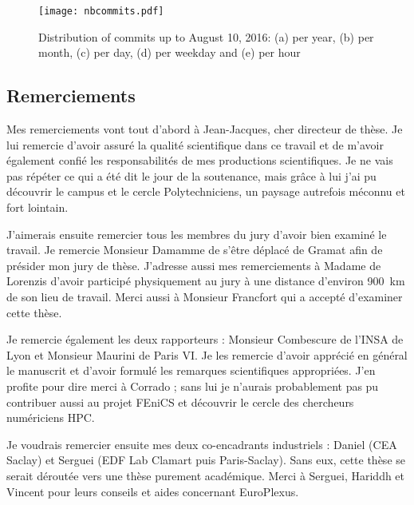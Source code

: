 \begin{figure}[htbp]
\centering
\texttt{[image: nbcommits.pdf]}
\caption{Distribution of commits up to August 10, 2016: (a) per year, (b) per month, (c) per day, (d) per weekday and (e) per hour} \label{fig:nbcommits}
\end{figure}

\subsection*{Remerciements}
Mes remerciements vont tout d'abord à Jean-Jacques, cher directeur de thèse. Je lui remercie d'avoir assuré la qualité scientifique dans ce travail et de m'avoir également confié les responsabilités de mes productions scientifiques. Je ne vais pas répéter ce qui a été dit le jour de la soutenance, mais grâce à lui j'ai pu découvrir le campus et le cercle Polytechniciens, un paysage autrefois méconnu et fort lointain.

\vspace{0.2cm}

J'aimerais ensuite remercier tous les membres du jury d'avoir bien examiné le travail. Je remercie Monsieur Damamme de s'être déplacé de Gramat afin de présider mon jury de thèse. J'adresse aussi mes remerciements à Madame de Lorenzis d'avoir participé physiquement au jury à une distance d'environ \SI{900}{km} de son lieu de travail. Merci aussi à Monsieur Francfort qui a accepté d'examiner cette thèse.

\vspace{0.2cm}

Je remercie également les deux rapporteurs : Monsieur Combescure de l'INSA de Lyon et Monsieur Maurini de Paris VI. Je les remercie d'avoir apprécié en général le manuscrit et d'avoir formulé les remarques scientifiques appropriées. J'en profite pour dire merci à Corrado ; sans lui je n'aurais probablement pas pu contribuer aussi au projet FEniCS et découvrir le cercle des chercheurs numériciens HPC.

\vspace{0.2cm}

Je voudrais remercier ensuite mes deux co-encadrants industriels : Daniel (CEA Saclay) et Serguei (EDF Lab Clamart puis Paris-Saclay). Sans eux, cette thèse se serait déroutée vers une thèse purement académique. Merci à Serguei, Hariddh et Vincent pour leurs conseils et aides concernant EuroPlexus.

\vspace{0.2cm}

